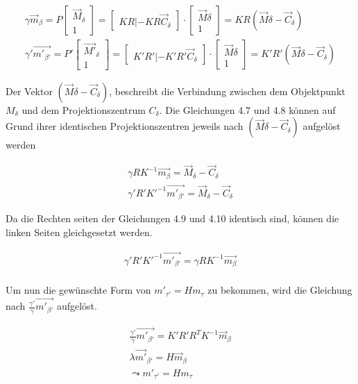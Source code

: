 \begin{gather}
\gamma \vec{m}_\beta = P \begin{bmatrix}\vec{M}_\delta\\1\end{bmatrix} = 
\begin{bmatrix}KR|-KR\vec{C}_\delta\end{bmatrix}\cdot \begin{bmatrix}\vec{M}\delta\\1\end{bmatrix} = KR(\vec{M}\delta - \vec{C}_\delta)\\
\gamma' \vec{m'_{\beta'}} = P' \begin{bmatrix}\vec{M'}_\delta\\1\end{bmatrix} = 
\begin{bmatrix}K'R'|-K'R'\vec{C}_\delta\end{bmatrix}\cdot \begin{bmatrix}\vec{M}\delta\\1\end{bmatrix} = K'R'(\vec{M}\delta - \vec{C}_\delta)
\end{gather}


Der Vektor $(\vec{M}\delta - \vec{C}_\delta)$, beschreibt die Verbindung zwischen dem Objektpunkt $M_\delta$  und dem Projektionszentrum $C_\delta$. Die Gleichungen 4.7 und 4.8 können auf Grund ihrer identischen Projektionszentren jeweils nach  $(\vec{M}\delta - \vec{C}_\delta)$ aufgelöst werden 

\begin{gather}
	\gamma RK^{-1}\vec{m_\beta} = \vec{M}_\delta - \vec{C}_\delta\\
	\gamma' R'K'^{-1}\vec{m'_{\beta'}} = \vec{M}_\delta - \vec{C}_\delta
\end{gather}

Da die Rechten seiten der Gleichungen 4.9 und 4.10 identisch sind, können die linken Seiten gleichgesetzt werden.

\begin{gather}
	\gamma' R'K'^{-1}\vec{m'_{\beta'}}=\gamma RK^{-1}\vec{m_\beta}\\
\end{gather}

Um nun die gewünschte Form von $m'_{\tau'} = Hm_{\tau}$ zu bekommen, wird die Gleichung nach $	\frac{\gamma'}{\gamma}\vec{m'_{\beta'}}$ aufgelöst.

\begin{gather}
	\frac{\gamma'}{\gamma}\vec{m'_{\beta'}} = K'R'R^TK^{-1}\vec{m}_\beta\\
\lambda \vec{m'}_{\beta'} = H\vec{m}_\beta\\
\leadsto m'_{\tau'} = H m_\tau
\end{gather}

